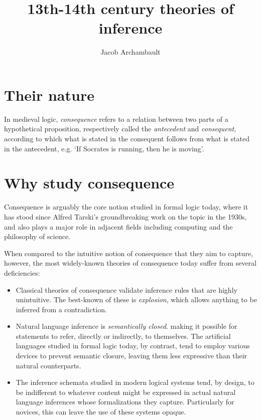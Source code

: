 \documentclass[]{article}
\title{13th-14th century theories of inference}
\author{Jacob Archambault}
\begin{document}
\maketitle

\section{Their nature}
In medieval logic, 
\emph{consequence} refers to a relation between two parts of a hypothetical proposition, 
respectively called the \emph{antecedent} and \emph{consequent}, 
according to which what is stated in the consequent follows from what is stated in the antecedent, 
e.g. `If Socrates is running, then he is moving'. 
\section{Why study consequence}
Consequence is arguably the core notion studied in formal logic today, 
where it has stood since Alfred Tarski's groundbreaking work on the topic in the 1930s, 
and also plays a major role in adjacent fields including computing and the philosophy of science. 

When compared to the intuitive notion of consequence that they aim to capture, 
however, 
the most widely-known theories of consequence today suffer from several deficiencies: 
\begin{itemize}
	\item Classical theories of consequence validate inference rules that are highly unintuitive. 
	The best-known of these is \emph{explosion}, 
	which allows anything to be inferred from a contradiction.
	\item Natural language inference is \emph{semantically closed}. 
	making it possible for statements to refer, 
	directly or indirectly, 
	to themselves. 
	The artificial languages studied in formal logic today, 
	by contrast, 
	tend to employ various devices to prevent semantic closure, 
	leaving them less expressive than their natural counterparts.
	\item The inference schemata studied in modern logical systems tend, 
	by design, 
	to be indifferent to whatever content might be expressed in actual natural language inferences whose formalizations they capture.
	Particularly for novices, this can leave the use of these systems opaque. 
\end{itemize}
\end{document}

